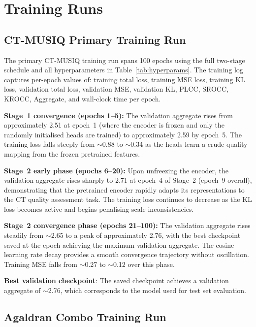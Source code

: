 \section{Training Runs}
\label{sec:exp_training}

\subsection{CT-MUSIQ Primary Training Run}

The primary CT-MUSIQ training run spans 100 epochs using the full two-stage schedule
and all hyperparameters in Table~\ref{tab:hyperparams}. The training log captures
per-epoch values of: training total loss, training MSE loss, training KL loss,
validation total loss, validation MSE, validation KL, PLCC, SROCC, KROCC, Aggregate,
and wall-clock time per epoch.

\textbf{Stage~1 convergence (epochs 1--5):} The validation aggregate rises from
approximately 2.51 at epoch~1 (where the encoder is frozen and only the randomly
initialised heads are trained) to approximately 2.59 by epoch~5. The training loss
falls steeply from $\sim$0.88 to $\sim$0.34 as the heads learn a crude quality mapping
from the frozen pretrained features.

\textbf{Stage~2 early phase (epochs 6--20):} Upon unfreezing the encoder, the
validation aggregate rises sharply to 2.71 at epoch~4 of Stage~2 (epoch~9 overall),
demonstrating that the pretrained encoder rapidly adapts its representations to the
CT quality assessment task. The training loss continues to decrease as the KL loss
becomes active and begins penalising scale inconsistencies.

\textbf{Stage~2 convergence phase (epochs 21--100):} The validation aggregate rises
steadily from $\sim$2.65 to a peak of approximately 2.76, with the best checkpoint
saved at the epoch achieving the maximum validation aggregate. The cosine learning rate
decay provides a smooth convergence trajectory without oscillation. Training MSE falls
from $\sim$0.27 to $\sim$0.12 over this phase.

\textbf{Best validation checkpoint}: The saved checkpoint achieves a validation
aggregate of $\sim$2.76, which corresponds to the model used for test set evaluation.

\subsection{Agaldran Combo Training Run}

